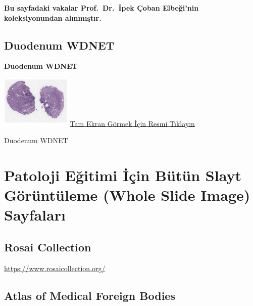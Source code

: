 \documentclass[
  letterpaper,
  DIV=11,
  numbers=noendperiod]{scrreprt}
\begin{document}
\textbf{Bu sayfadaki vakalar Prof.~Dr.~İpek Çoban Elbeği'nin
koleksiyonundan alınmıştır.}

\hypertarget{sec-ICE1-WDNET-duodenum}{%
\section{Duodenum WDNET}\label{sec-ICE1-WDNET-duodenum}}

\textbf{Duodenum WDNET}

\href{https://images.patolojiatlasi.com/ICE1-WDNET-duodenum/HE.html}{\includegraphics[width=0.25\textwidth,height=\textheight]{./screenshots/ICE1-WDNET-duodenum-HE_screenshot.png}}
\href{https://images.patolojiatlasi.com/ICE1-WDNET-duodenum/HE.html}{Tam
Ekran Görmek İçin Resmi Tıklayın}

\begin{tcolorbox}[enhanced jigsaw, left=2mm, toprule=.15mm, rightrule=.15mm, bottomrule=.15mm, leftrule=.75mm, colback=white, colframe=quarto-callout-tip-color-frame, toptitle=1mm, breakable, titlerule=0mm, colbacktitle=quarto-callout-tip-color!10!white, bottomtitle=1mm, title=\textcolor{quarto-callout-tip-color}{\faLightbulb}\hspace{0.5em}{Tanı}, arc=.35mm, opacitybacktitle=0.6, opacityback=0, coltitle=black]

Duodenum WDNET

\end{tcolorbox}

\hypertarget{sec-wsi-sayfalari}{%
\chapter{Patoloji Eğitimi İçin Bütün Slayt Görüntüleme (Whole Slide
Image) Sayfaları}\label{sec-wsi-sayfalari}}

\hypertarget{sec-rosai-collection}{%
\section{Rosai Collection}\label{sec-rosai-collection}}

\url{https://www.rosaicollection.org/}

\hypertarget{sec-atlas-of-medical-foreign-bodies}{%
\section{Atlas of Medical Foreign
Bodies}\label{sec-atlas-of-medical-foreign-bodies}}
\end{document}
